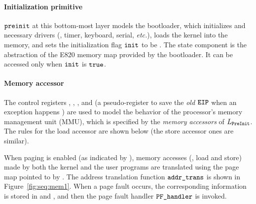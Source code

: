 \paragraph{Initialization primitive}
${\texttt{preinit}}$
at this bottom-most layer models the bootloader,
which initializes  and necessary drivers
(\eg, timer, keyboard, serial, {\it etc.}),
loads the kernel into the memory,
and sets the initialization flag ${\texttt{init}}$ to be .
The state component  is the abstraction of the
E820 memory map provided by the bootloader.
It can be accessed only when 
${\texttt{init}}$ is ${\texttt{true}}$.

\paragraph{Memory accessor} 
The control registers , ,  ,
and 
(a pseudo-register to save the \emph{old ${\texttt{EIP}}$} when an exception happens
)
are used to model the behavior
of the processor's memory management unit (MMU),
which is specified by the \emph{memory accessors}
of $L_{\texttt{PreInit}}$.
The rules for the load accessor are shown below
(the store accessor ones are similar).

When paging is enabled (as indicated by ),
memory accesses (\ie, load and store) made by both the kernel and the user programs
are translated using the page map pointed to by .
The address translation function
${\texttt{addr\_trans}}$ is
shown in Figure~\ref{fig:seq:mem1}.
When a page fault occurs,
the corresponding information is stored in 
and ,
and then the page fault handler ${\texttt{PF\_handler}}$ is invoked.

